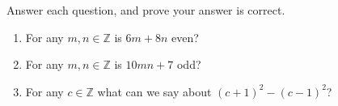 Answer each question, and prove your answer is correct.
\begin{enumerate}
    \item For any $m, n \in \mathbb{Z}$ is $6m + 8n$ even?
    \item For any $m, n \in \mathbb{Z}$ is $10mn + 7$ odd?
    \item For any $c \in \mathbb{Z}$ what can we say about $(c + 1)^2 - (c - 1)^2$?
\end{enumerate}